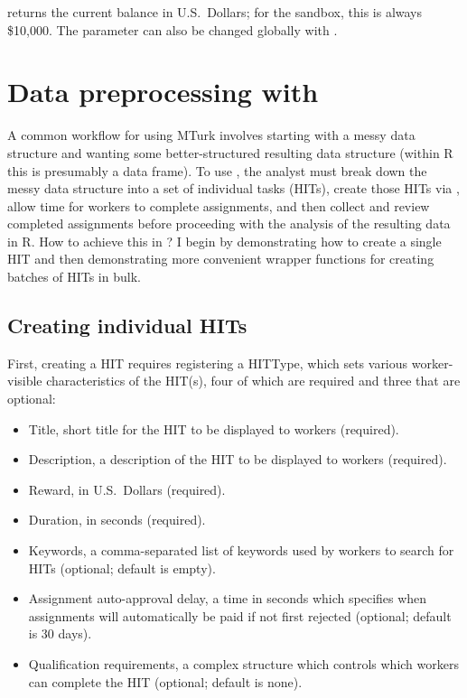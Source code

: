 \noindent {} returns the current balance in
U.S.~Dollars; for the sandbox, this is always \$10,000. The
 parameter can also be changed globally with
.


\section[Data preprocessing with MTurkR]{Data preprocessing with }

A common workflow for using MTurk involves starting with a messy data
structure and wanting some better-structured resulting data structure
(within R this is presumably a data frame). To use , the analyst must break down
the messy data structure into a set of individual tasks (HITs), create
those HITs via , allow time for workers to complete
assignments, and then collect and review completed assignments before
proceeding with the analysis of the resulting data in R. How to achieve
this in ? I begin by demonstrating how to create a single
HIT and then demonstrating more convenient wrapper functions for
creating batches of HITs in bulk.

\subsection{Creating individual HITs}
First, creating a HIT requires registering a HITType, which sets various worker-visible characteristics of the HIT(s), four of which are required and three that are optional:

\begin{itemize}
\item Title, short title for the HIT to be displayed to workers (required).
\item Description, a description of the HIT to be displayed to workers (required).
\item Reward, in U.S.~Dollars (required).
\item Duration, in seconds (required).
\item Keywords, a comma-separated list of keywords used by workers to search for HITs (optional; default is empty).
\item Assignment auto-approval delay, a time in seconds which specifies when assignments will automatically be paid if not first rejected (optional; default is 30 days).
\item Qualification requirements, a complex structure which controls which workers can complete the HIT (optional; default is none).
\end{itemize}

